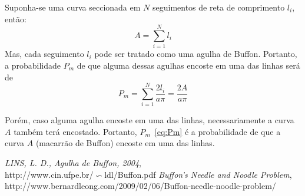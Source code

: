 \documentclass [a4paper,10pt]{article}
\begin{document}
      Suponha-se uma curva seccionada em $N$ seguimentos de reta de comprimento $l_i$, então:
      \begin{equation}\label{eq:A}
        A = \sum^N_{i = 1}l_i
      \end{equation}
      Mas, cada seguimento $l_i$ pode ser tratado como uma agulha de Buf{f}on. Portanto, a probabilidade $P_m$
      de que alguma dessas agulhas encoste em uma das linhas será de
      \begin{equation}\label{eq:Pm}
        P_m = \sum^N_{i = 1}\frac{2l_i}{a\pi} = \frac{2A}{a\pi}
      \end{equation}
      
      Porém, caso alguma agulha encoste em uma das linhas, necessariamente a curva $A$ também terá encostado.
      Portanto, $P_m$~\eqref{eq:Pm} é a probabilidade de que a curva $A$ (macarrão de Buf{f}on) encoste em
      uma das linhas.
      
  \begin{thebibliography}{99}
     \emph{LINS, L. D., Agulha de Bu{f}fon, 2004},\\
    http://www.cin.ufpe.br/$\backsim$ldl/Buffon.pdf
     \emph{Buf{f}on’s Needle and Noodle Problem},\\
    http://www.bernardleong.com/2009/02/06/Buffon-needle-noodle-problem/
  \end{thebibliography}
\end{document}
